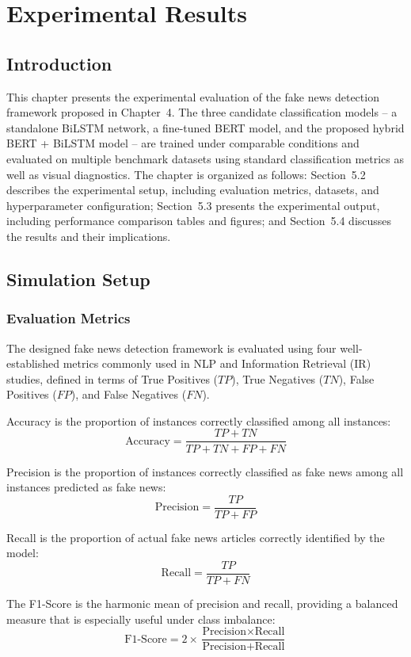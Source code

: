 \sloppy
\chapter{Experimental Results}
\section{Introduction}

This chapter presents the experimental evaluation of the fake news detection framework proposed in Chapter~4. The three candidate classification models -- a standalone BiLSTM network, a fine-tuned BERT model, and the proposed hybrid BERT + BiLSTM model -- are trained under comparable conditions and evaluated on multiple benchmark datasets using standard classification metrics as well as visual diagnostics. The chapter is organized as follows: Section~5.2 describes the experimental setup, including evaluation metrics, datasets, and hyperparameter configuration; Section~5.3 presents the experimental output, including performance comparison tables and figures; and Section~5.4 discusses the results and their implications.

\section{Simulation Setup}

\subsection{Evaluation Metrics}

The designed fake news detection framework is evaluated using four well-established metrics commonly used in NLP and Information Retrieval (IR) studies, defined in terms of True Positives ($TP$), True Negatives ($TN$), False Positives ($FP$), and False Negatives ($FN$).

Accuracy is the proportion of instances correctly classified among all instances:
\[
\text{Accuracy} = \frac{TP + TN}{TP + TN + FP + FN}
\]

Precision is the proportion of instances correctly classified as fake news among all instances predicted as fake news:
\[
\text{Precision} = \frac{TP}{TP + FP}
\]

Recall is the proportion of actual fake news articles correctly identified by the model:
\[
\text{Recall} = \frac{TP}{TP + FN}
\]

The F1-Score is the harmonic mean of precision and recall, providing a balanced measure that is especially useful under class imbalance:
\[
\text{F1-Score} = 2 \times \frac{\text{Precision} \times \text{Recall}}{\text{Precision} + \text{Recall}}
\]

